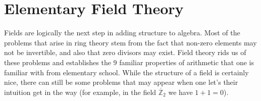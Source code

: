 \begingroup
    \ifcsname\PATH\endcsname
        \newcommand{\PATH}{books/Algebra/Galois_Theory}
        \newcommand{\OLDPATH}{\PATH}
    \else
        \newcommand{\OLDPATH}{\PATH}
        \renewcommand{\PATH}{books/Algebra/Galois_Theory}
    \fi
    \chapter{Elementary Field Theory}
    Fields are logically the next step in adding structure to algebra. Most of
    the problems that arise in ring theory stem from the fact that non-zero
    elements may not be invertible, and also that zero divisors may exist. Field
    theory rids us of these problems and establishes the 9 familiar properties
    of arithmetic that one is familiar with from elementary school. While the
    structure of a field is certainly nice, there can still be some problems
    that may appear when one let's their intuition get in the way (for example,
    in the field $\ring{\mathbb{Z}_{2}}$ we have $1+1=0$).
    
     
\endgroup